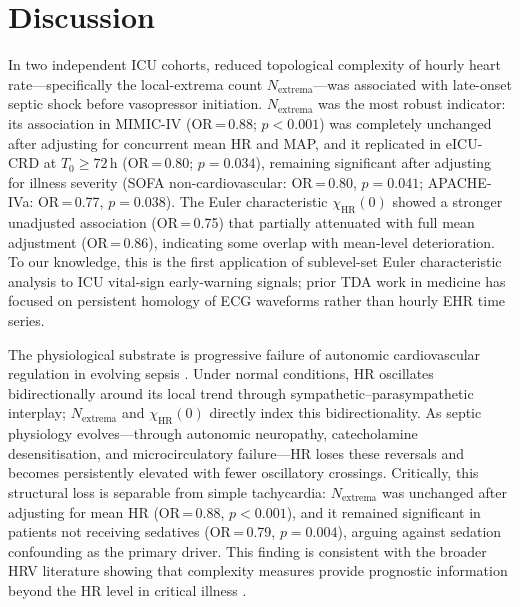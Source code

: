 \documentclass[12pt,a4paper]{article}
\begin{document}
\section{Discussion}
\label{sec:discussion}

In two independent ICU cohorts, reduced topological complexity of hourly
heart rate---specifically the local-extrema count $N_{\text{extrema}}$---was
associated with late-onset septic shock before vasopressor initiation.
$N_{\text{extrema}}$ was the most robust indicator: its association in
MIMIC-IV (OR\,=\,0.88; $p<0.001$) was completely unchanged after adjusting
for concurrent mean HR and MAP, and it replicated in eICU-CRD at
$T_0\geq 72$\,h (OR\,=\,0.80; $p=0.034$), remaining significant after
adjusting for illness severity (SOFA non-cardiovascular: OR\,=\,0.80,
$p=0.041$; APACHE-IVa: OR\,=\,0.77, $p=0.038$).
The Euler characteristic $\chi_{\text{HR}}(0)$ showed a stronger unadjusted
association (OR\,=\,0.75) that partially attenuated with full mean adjustment
(OR\,=\,0.86), indicating some overlap with mean-level deterioration.
To our knowledge, this is the first application of sublevel-set Euler
characteristic analysis to ICU vital-sign early-warning signals; prior TDA
work in medicine has focused on persistent homology of ECG waveforms
\cite{chung2021} rather than hourly EHR time series.

The physiological substrate is progressive failure of autonomic cardiovascular
regulation in evolving sepsis \cite{decastilho2018,carrara2021}.
Under normal conditions, HR oscillates bidirectionally around its local trend
through sympathetic--parasympathetic interplay; $N_{\text{extrema}}$ and
$\chi_{\text{HR}}(0)$ directly index this bidirectionality.
As septic physiology evolves---through autonomic neuropathy, catecholamine
desensitisation, and microcirculatory failure---HR loses these reversals and
becomes persistently elevated with fewer oscillatory crossings.
Critically, this structural loss is separable from simple tachycardia:
$N_{\text{extrema}}$ was unchanged after adjusting for mean HR (OR\,=\,0.88,
$p<0.001$), and it remained significant in patients not receiving sedatives
(OR\,=\,0.79, $p=0.004$), arguing against sedation confounding as the
primary driver.
This finding is consistent with the broader HRV literature showing that
complexity measures provide prognostic information beyond the HR level
in critical illness \cite{moorman2011}.
\end{document}
